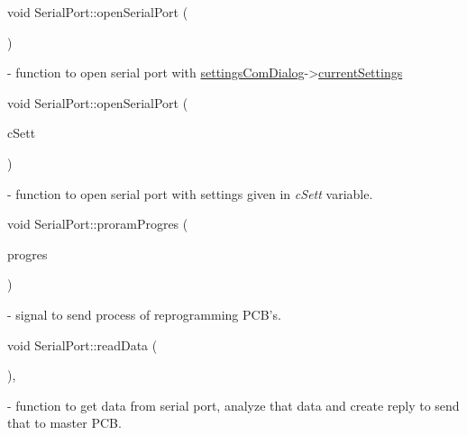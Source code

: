 \mbox{\label{classSerialPort_ab831db6582a7b576adf5059555e0297f}} 
{\footnotesize\ttfamily void Serial\+Port\+::\texorpdfstring{open\+Serial\+Port}{openSerialPort}{\footnotesize\ttfamily [1/2]} (\begin{DoxyParamCaption}{ }\end{DoxyParamCaption})\hspace{0.3cm}{\ttfamily [slot]}} - function to open serial port with \hyperlink{classSerialPort_a9ab445f818748122d3368fd2e9dbbbea}{settings\+Com\+Dialog}->\hyperlink{classSerialSettingsDialog_ab24259a0385b292ff104425d97957482}{current\+Settings} 

\mbox{\label{classSerialPort_ac4f59ca6f1401ed8bbc6de3f99cfa411}} 
{\footnotesize\ttfamily void Serial\+Port\+::\texorpdfstring{open\+Serial\+Port}{openSerialPort}{\footnotesize\ttfamily [2/2]} (\begin{DoxyParamCaption}\item[{\mbox{\hyperlink{structComSettings}{Com\+Settings}}}]{c\+Sett }\end{DoxyParamCaption})\hspace{0.3cm}{\ttfamily [slot]}} - function to open serial port with settings given in \textit{c\+Sett} variable.

\mbox{\label{classSerialPort_a38b94a606dab2af9cbeac4f48ddd831c}} 
{\footnotesize\ttfamily void Serial\+Port\+::\texorpdfstring{proram\+Progres}{proramProgres} (\begin{DoxyParamCaption}\item[{int}]{progres }\end{DoxyParamCaption})\hspace{0.3cm}{\ttfamily [signal]}} - signal to send process of reprogramming PCB's. 

\mbox{\label{classSerialPort_a0b8fe1371e829199856e8cae942de94e}} 
{\footnotesize\ttfamily void Serial\+Port\+::\texorpdfstring{read\+Data}{readData} (\begin{DoxyParamCaption}{ }\end{DoxyParamCaption})\hspace{0.3cm}{\ttfamily [private]}, {\ttfamily [slot]}} - function to get data from serial port, analyze that data and create reply to send that to master PCB. 

